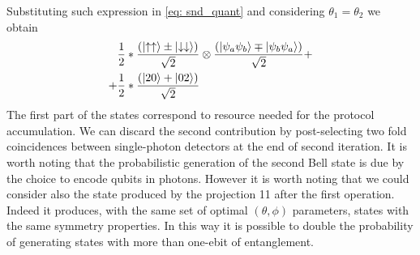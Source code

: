 \documentclass[
	aps, pra,
	superscriptaddress, twocolumn,
	floatfix,
	10pt
]{revtex4-1}
\newcommand{\parTitle}[1]{\noindent{\color{Mahogany}(\emph{#1})}}
\newcommand{\calH}{{\mathcal{H}}}
\begin{document}
Substituting such expression in \cref{eq: snd_quant} and considering $\theta_1 = \theta_2$ we obtain 
\begin{align}
\frac{1}{2}& * \frac{\left( \ket{\uparrow \uparrow} \pm
\ket{\downarrow \downarrow}\right) }{\sqrt{2}}\otimes \frac{\left( \ket{\psi_a \psi_b} \mp
\ket{\psi_b \psi_a}\right) }{\sqrt{2}} +\notag\\
+\frac{1}{2}& *\frac{\left( \ket{20} +
\ket{02}\right) }{\sqrt{2}}
\end{align}
The first part of the states correspond to resource needed for the protocol accumulation. We can discard the second contribution by post-selecting two fold coincidences between single-photon detectors at the end of second iteration. It is worth noting that the probabilistic generation of the second Bell state is due by the choice to encode qubits in photons. However it is worth noting that we could consider also the state  produced by the projection 11 after the first operation. Indeed it produces, with the same set of optimal $(\theta, \phi)$ parameters, states with the same symmetry properties. In this way it is possible to double the probability of generating states with more than one-ebit of entanglement.

\appendix



\end{document}
